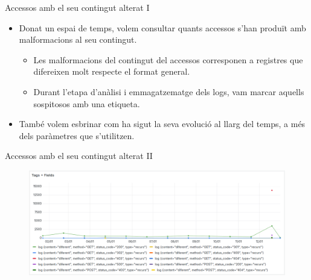 \begin{frame}{Accessos amb el seu contingut alterat I}
    \begin{itemize}
        \item Donat un espai de temps, volem consultar quants accessos s'han produït amb malformacions al seu contingut.

        \begin{itemize}
            \item Les malformacions del contingut del accessos corresponen a registres que difereixen molt respecte el format general.
            \item Durant l'etapa d'anàlisi i emmagatzematge dels logs, vam marcar aquells sospitosos amb una etiqueta.
        \end{itemize}

        \item També volem esbrinar com ha sigut la seva evolució al llarg del temps, a més dels paràmetres que s'utilitzen.
    \end{itemize}
\end{frame}

\begin{frame}{Accessos amb el seu contingut alterat II}
    \begin{figure}
        \includegraphics[width=\textwidth]{figures/possible-attacks}\label{fig:use-case-2}
    \end{figure}
\end{frame}

